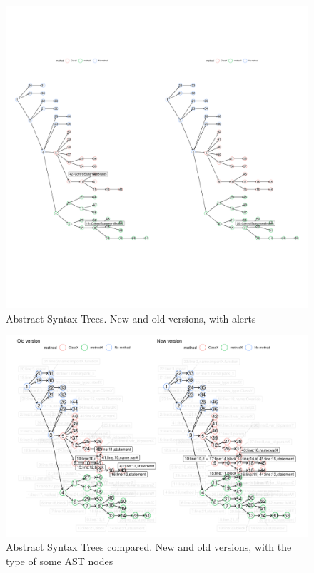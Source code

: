 \documentclass[
]{article}
\begin{document}
\begin{figure}[H]
\includegraphics[width=1\linewidth]{report_files/figure-latex/unnamed-chunk-2-1} \caption{Abstract Syntax Trees. New and old versions, with alerts \label{AST_compare_id_alerts}}\label{fig:unnamed-chunk-2}
\end{figure}

\normalsize

\small

\begin{figure}[H]
\includegraphics[width=1\linewidth]{report_files/figure-latex/unnamed-chunk-3-1} \caption{Abstract Syntax Trees compared. New and old versions, with the type of some AST nodes \label{AST_compare}}\label{fig:unnamed-chunk-3}
\end{figure}
\end{document}
